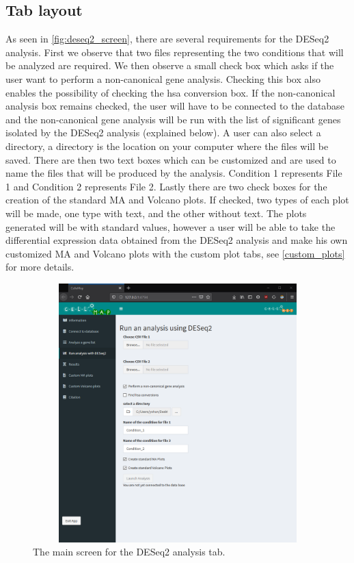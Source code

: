 \documentclass[11pt]{article}
\begin{document}
\subsection{Tab layout \label{deseq2_layout}}
As seen in \autoref{fig:deseq2_screen}, there are several requirements for the \acrshort{DESeq2} analysis. First we observe that two files representing the two conditions that will be analyzed are required. We then observe a small check box which asks if the user want to perform a non-canonical gene analysis. Checking this box also enables the possibility of checking the \acrshort{hsa} conversion box. If the non-canonical analysis box remains checked, the user will have to be connected to the database and the non-canonical gene analysis will be run with the list of significant genes isolated by the \acrshort{DESeq2} analysis (explained below). A user can also select a directory, a directory is the location on your computer where the files will be saved.
There are then two text boxes which can be customized and are used to name the files that will be produced by the analysis. Condition 1 represents File 1 and Condition 2 represents File 2.
Lastly there are two check boxes for the creation of the standard MA and Volcano plots. If checked, two types of each plot will be made, one type with text, and the other without text. The plots generated will be with standard values, however a user will be able to take the differential expression data obtained from the \acrshort{DESeq2} analysis and make his own customized MA and Volcano plots with the custom plot tabs, see \autoref{custom_plots} for more details.

\begin{figure}[h!]
\centering
\includegraphics[width=15cm,height=10cm,keepaspectratio]{deseq2_screen.png}
\caption{The main screen for the \acrshort{DESeq2} analysis tab.}
\label{fig:deseq2_screen}
\end{figure}
\end{document}
